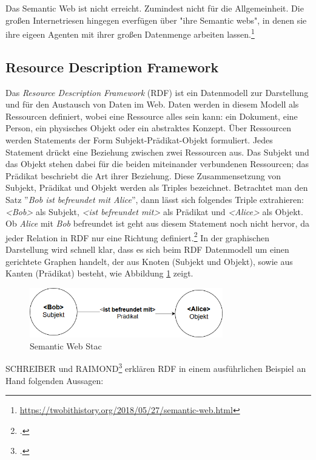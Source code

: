 \documentclass[12pt,a4paper]{article}
\begin{document}
Das Semantic Web ist nicht erreicht. Zumindest nicht für die Allgemeinheit. Die großen Internetriesen hingegen everfügen über "ihre Semantic webs", in denen sie ihre eigeen Agenten mit ihrer großen Datenmenge arbeiten lassen.\footnote{\url{https://twobithistory.org/2018/05/27/semantic-web.html}}

\subsection{Resource Description Framework}

Das \textit{Resource Description Framework} (RDF) ist ein Datenmodell zur Darstellung und für den Austausch von Daten im Web. Daten werden in diesem Modell als Ressourcen definiert, wobei eine Ressource alles sein kann: ein Dokument, eine Person, ein physisches Objekt oder ein abstraktes Konzept. Über Ressourcen werden Statements der Form Subjekt-Prädikat-Objekt formuliert. Jedes Statement drückt eine Beziehung zwischen zwei Ressourcen aus. Das Subjekt und das Objekt stehen dabei für die beiden miteinander verbundenen Ressourcen; das Prädikat beschriebt die Art ihrer Beziehung. Diese Zusammensetzung von Subjekt, Prädikat und Objekt werden als Triples bezeichnet. Betrachtet man den Satz ''\textit{Bob ist befreundet mit Alice}'', dann lässt sich folgendes Triple extrahieren: \textit{<Bob>} als Subjekt, \textit{<ist befreundet mit>} als Prädikat und \textit{<Alice>} als Objekt. Ob \textit{Alice} mit \textit{Bob} befreundet ist geht aus diesem Statement noch nicht hervor, da jeder Relation in RDF nur eine Richtung definiert.\footcite[Vgl.][S.16-21]{powers2003practical} In der graphischen Darstellung wird schnell klar, dass es sich beim RDF Datenmodell um einen gerichtete Graphen handelt, der aus Knoten (Subjekt und Objekt), sowie aus Kanten (Prädikat) besteht, wie Abbildung \ref{fig:triple} zeigt.
\begin{figure}[h]
  \centering
	\includegraphics[width=0.75\textwidth]{img/triple.png}  
    \caption[ Semantic Web Stac]{ Semantic Web Stac}
  	\label{fig:triple}
\end{figure}
SCHREIBER und RAIMOND\footcite[Vgl.][]{schreiber2014rdf} erklären RDF in einem ausführlichen Beispiel an Hand folgenden Aussagen:
\end{document}
